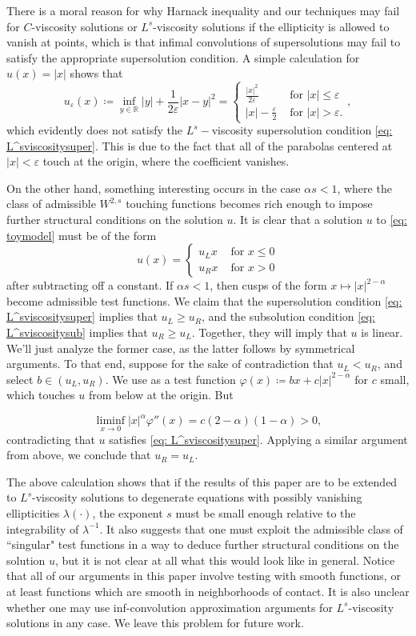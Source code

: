 \documentclass[reqno]{amsart}
\numberwithin{equation}{section}
\numberwithin{equation}{section}
\newcommand{\R}{\mathbb R}
\newcommand{\eps}{\varepsilon}
\newcommand{\vphi}{\varphi}
\newcounter{case}
\begin{document}
There is a moral reason for why Harnack inequality and our techniques may fail for $C$-viscosity solutions or $L^s$-viscosity solutions if the ellipticity is allowed to vanish at points, which is that infimal convolutions of supersolutions may fail to satisfy the appropriate supersolution condition. A simple calculation for $u(x) =|x|$ shows that
$$u_\eps(x) \coloneqq \inf_{y \in \R} |y| + \frac{1}{2\eps}|x-y|^2 = \begin{cases} \frac{|x|^2}{2\eps} & \text{ for } |x| \le \eps \\ |x| - \frac\eps2 & \text{ for } |x|>\eps.\end{cases},$$
which evidently does not satisfy the $L^s-$viscosity supersolution condition \eqref{eq: L^sviscositysuper}. This is due to the fact that all of the parabolas centered at $|x|<\eps$ touch at the origin, where the coefficient vanishes. 
\\\par On the other hand, something interesting occurs in the case $\alpha s < 1$, where the class of admissible $W^{2,s}$ touching functions becomes rich enough to impose further structural conditions on the solution $u$. It is clear that a solution $u$ to \eqref{eq: toymodel} must be of the form
$$u(x) = \begin{cases}  u_L x & \text{ for } x\le 0 \\  u_R x & \text{ for } x>0\end{cases}$$
after subtracting off a constant. If $\alpha s<1$, then cusps of the form $x \mapsto |x|^{2-\alpha}$ become admissible test functions. We claim that the supersolution condition \eqref{eq: L^sviscositysuper} implies that $u_L \ge u_R$, and the subsolution condition \eqref{eq: L^sviscositysub} implies that $u_R \ge u_L$. Together, they will imply that $u$ is linear. We'll just analyze the former case, as the latter follows by symmetrical arguments. To that end, suppose for the sake of contradiction that $u_L <u_R$, and select $b \in (u_L, u_R)$. We use as a test function $\vphi(x)\coloneqq bx + c|x|^{2-\alpha}$ for $c$ small, which touches $u$ from below at the origin. But

$$\liminf_{x \to 0} |x|^\alpha \vphi''(x) = c(2-\alpha)(1-\alpha) >0,$$
contradicting that $u$ satisfies \eqref{eq: L^sviscositysuper}. Applying a similar argument from above, we conclude that $u_R=u_L$. 

The above calculation shows that if the results of this paper are to be extended to $L^s$-viscosity solutions to degenerate equations with possibly vanishing ellipticities $\lambda(\cdot)$, the exponent $s$ must be small enough relative to the integrability of $\lambda^{-1}$. It also suggests that one must exploit the admissible class of ``singular" test functions in a way to deduce further structural conditions on the solution $u$, but it is not clear at all what this would look like in general. Notice that all of our arguments in this paper involve testing with smooth functions, or at least functions which are smooth in neighborhoods of contact. It is also unclear whether one may use inf-convolution approximation arguments for $L^s$-viscosity solutions in any case. We leave this problem for future work.


\end{document}
